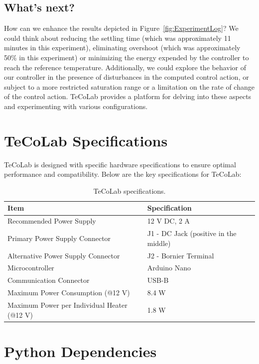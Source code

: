 \documentclass[12pt]{report}
\begin{document}
\section{What's next?}

How can we enhance the results depicted in Figure~\ref{fig:ExperimentLog}? We could think about reducing the settling time (which was approximately 11 minutes in this experiment), eliminating overshoot (which was approximately 50\% in this experiment) or minimizing the energy expended by the controller to reach the reference temperature. Additionally, we could explore the behavior of our controller in the presence of disturbances in the computed control action, or subject to a more restricted saturation range or a limitation on the rate of change of the control action. TeCoLab provides a platform for delving into these aspects and experimenting with various configurations.

\chapter{TeCoLab Specifications}\label{chap:TeCoLabSpecs}

TeCoLab is designed with specific hardware specifications to ensure optimal performance and compatibility. Below are the key specifications for TeCoLab:

\begin{table}[!htbp]
\centering
\begin{tabular}{|l|l|}
\hline
\textbf{Item} & \textbf{Specification} \\ \hline
Recommended Power Supply & 12 V DC, 2 A \\ \hline
Primary Power Supply Connector & J1 - DC Jack (positive in the middle) \\ \hline
Alternative Power Supply Connector & J2 - Bornier Terminal \\ \hline
Microcontroller & Arduino Nano \\ \hline
Communication Connector & USB-B \\ \hline
Maximum Power Consumption (@12 V) & 8.4 W \\ \hline
Maximum Power per Individual Heater (@12 V) & 1.8 W \\ \hline
\end{tabular}
\caption{TeCoLab specifications.}\label{tab:TeCoLabSpecs}
\end{table}

\chapter{Python Dependencies}\label{chap:dependencies}
\end{document}
